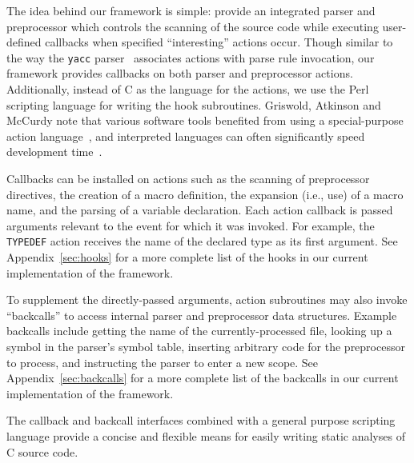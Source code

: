 \documentclass{article}
\newcommand{\Perl}{\mbox{Perl}}
\newcommand{\C}{\mbox{C}}
\newcommand{\ie}{i.e.,}
\begin{document}
The idea behind our framework is simple: provide an integrated parser
and preprocessor which controls the scanning of the source code while
executing user-defined callbacks when specified ``interesting'' actions occur.
Though similar to the way the \texttt{yacc} parser~\cite{Levine92}
associates actions with parse rule invocation, our framework provides
callbacks on both parser and preprocessor actions. Additionally,
instead of \C{} as the language for the actions, we use the \Perl{} scripting
language for writing the hook subroutines.  Griswold, Atkinson and McCurdy note
that various software tools benefited from using a special-purpose
action language~\cite{Griswold96}, and interpreted languages can
often significantly speed development time~\cite{Scripting}.

Callbacks can be installed on actions such as the scanning of preprocessor directives, the
creation of a macro definition, the expansion (\ie{} use) of a macro
name, and the parsing of a variable declaration.  Each action callback
is passed arguments relevant to the event for which it was invoked.  For
example, the \texttt{TYPEDEF} action receives the name of the declared
type as its first argument.  See Appendix~\ref{sec:hooks} for a more complete list of
the hooks in our current implementation of the framework.

To supplement the directly-passed arguments, action subroutines may also invoke
``backcalls'' to access internal
parser and preprocessor data structures. Example backcalls include
getting the name of the currently-processed file, looking up a symbol in
the parser's symbol table, inserting arbitrary code for the preprocessor
to process, and instructing the parser to enter a new scope. 
See Appendix~\ref{sec:backcalls} for a more complete list of
the backcalls in our current implementation of the framework.

The callback and backcall interfaces combined with a general
purpose scripting language provide a concise and flexible means for
easily writing static analyses of \C{} source code.
\end{document}
